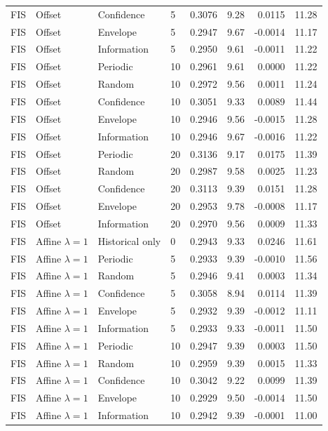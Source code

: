 \begin{longtable}{llllrrrr}
FIS & Offset & Confidence & 5 & 0.3076 & 9.28 & 0.0115 & 11.28 \\
FIS & Offset & Envelope & 5 & 0.2947 & 9.67 & -0.0014 & 11.17 \\
FIS & Offset & Information & 5 & 0.2950 & 9.61 & -0.0011 & 11.22 \\
FIS & Offset & Periodic & 10 & 0.2961 & 9.61 & 0.0000 & 11.22 \\
FIS & Offset & Random & 10 & 0.2972 & 9.56 & 0.0011 & 11.24 \\
FIS & Offset & Confidence & 10 & 0.3051 & 9.33 & 0.0089 & 11.44 \\
FIS & Offset & Envelope & 10 & 0.2946 & 9.56 & -0.0015 & 11.28 \\
FIS & Offset & Information & 10 & 0.2946 & 9.67 & -0.0016 & 11.22 \\
FIS & Offset & Periodic & 20 & 0.3136 & 9.17 & 0.0175 & 11.39 \\
FIS & Offset & Random & 20 & 0.2987 & 9.58 & 0.0025 & 11.23 \\
FIS & Offset & Confidence & 20 & 0.3113 & 9.39 & 0.0151 & 11.28 \\
FIS & Offset & Envelope & 20 & 0.2953 & 9.78 & -0.0008 & 11.17 \\
FIS & Offset & Information & 20 & 0.2970 & 9.56 & 0.0009 & 11.33 \\
FIS & Affine $\lambda=1$ & Historical only & 0 & 0.2943 & 9.33 & 0.0246 & 11.61 \\
FIS & Affine $\lambda=1$ & Periodic & 5 & 0.2933 & 9.39 & -0.0010 & 11.56 \\
FIS & Affine $\lambda=1$ & Random & 5 & 0.2946 & 9.41 & 0.0003 & 11.34 \\
FIS & Affine $\lambda=1$ & Confidence & 5 & 0.3058 & 8.94 & 0.0114 & 11.39 \\
FIS & Affine $\lambda=1$ & Envelope & 5 & 0.2932 & 9.39 & -0.0012 & 11.11 \\
FIS & Affine $\lambda=1$ & Information & 5 & 0.2933 & 9.33 & -0.0011 & 11.50 \\
FIS & Affine $\lambda=1$ & Periodic & 10 & 0.2947 & 9.39 & 0.0003 & 11.50 \\
FIS & Affine $\lambda=1$ & Random & 10 & 0.2959 & 9.39 & 0.0015 & 11.33 \\
FIS & Affine $\lambda=1$ & Confidence & 10 & 0.3042 & 9.22 & 0.0099 & 11.39 \\
FIS & Affine $\lambda=1$ & Envelope & 10 & 0.2929 & 9.50 & -0.0014 & 11.50 \\
FIS & Affine $\lambda=1$ & Information & 10 & 0.2942 & 9.39 & -0.0001 & 11.00 \\

\end{longtable}
